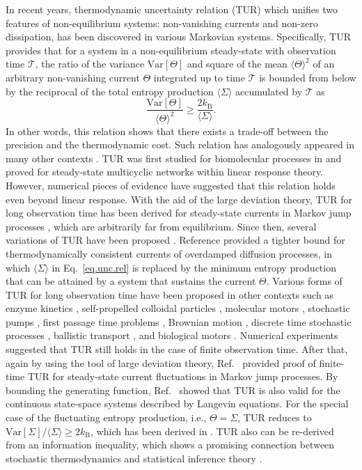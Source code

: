 \documentclass[pre,
twocolumn,
]{revtex4-1}
\theoremstyle{definition}
\theoremstyle{definition}
\newcommand{\mca}{\mathcal}
\newcommand{\mrm}{\mathrm}
\newcommand{\eq}[1]{\begin{equation}#1\end{equation}}
\newcommand{\avg}[1]{\langle #1\rangle}
\newcommand{\inl}[1]{$ #1 $}
\begin{document}
In recent years, thermodynamic uncertainty relation (TUR) which unifies two features of non-equilibrium systems: non-vanishing currents and non-zero dissipation, has been discovered in various Markovian systems.
Specifically, TUR provides that for a system in a non-equilibrium steady-state with observation time \inl{\mca{T}}, the ratio of the variance \inl{\mrm{Var}[\Theta]} and square of the mean \inl{\avg{\Theta}^2} of an arbitrary non-vanishing current \inl{\Theta} integrated up to time \inl{\mca{T}} is bounded from below by the reciprocal of the total entropy production \inl{\avg{\Sigma}} accumulated by \inl{\mca{T}} as
\eq{
\frac{\mrm{Var}[\Theta]}{\avg{\Theta}^2}\ge\frac{2k_{\mrm{B}}}{\avg{\Sigma}}.\label{eq.unc.rel}
}
In other words, this relation shows that there exists a trade-off between the precision and the thermodynamic cost.
Such relation has analogously appeared in many other contexts \cite{Mehta.2012.PNAS,Hasegawa.2018.PRE}.
TUR was first studied for biomolecular processes in \cite{Barato.2015.PRL} and proved for steady-state multicyclic networks within linear response theory.
However, numerical pieces of evidence \cite{Barato.2015.PRL} have suggested that this relation holds even beyond linear response.
With the aid of the large deviation theory, TUR for long observation time has been derived for steady-state currents in Markov jump processes \cite{Gingrich.2016.PRL}, which are arbitrarily far from equilibrium.
Since then, several variations of TUR have been proposed \cite{Pietzonka.2016.PRE}.
Reference \cite{Polettini.2016.PRE} provided a tighter bound for thermodynamically consistent currents of overdamped diffusion processes, in which \inl{\avg{\Sigma}} in Eq.~\eqref{eq.unc.rel} is replaced by the minimum entropy production that can be attained by a system that sustains the current \inl{\Theta}.
Various forms of TUR for long observation time have been proposed in other contexts such as enzyme kinetics \cite{Barato.2015.JPCB}, self-propelled colloidal particles \cite{Falasco.2016.PRE}, molecular motors \cite{Patrick.2016.JSM}, stochastic pumps \cite{Rotskoff.2017.PRE}, first passage time problems \cite{Garrahan.2017.PRE,Gingrich.2017.PRL}, Brownian motion \cite{Hyeon.2017.PRE}, discrete time stochastic processes \cite{Karel.2017.EPL,Chiuchiu.2018.PRE}, ballistic transport \cite{Brandner.2018.PRL}, and biological motors \cite{Hwang.2018.JPCL}.
Numerical experiments \cite{Pietzonka.2017.PRE} suggested that TUR still holds in the case of finite observation time.
After that, again by using the tool of large deviation theory, Ref.~\cite{Horowitz.2017.PRE} provided proof of finite-time TUR for steady-state current fluctuations in Markov jump processes.
By bounding the generating function, Ref.~\cite{Andreas.2018.JSM} showed that TUR is also valid for the continuous state-space systems described by Langevin equations.
For the special case of the fluctuating entropy production, i.e., \inl{\Theta=\Sigma}, TUR reduces to \inl{\mrm{Var}[\Sigma]/\avg{\Sigma}\ge 2k_{\mrm{B}}}, which has been derived in \cite{Pigolotti.2017.PRL}.
TUR also can be re-derived from an information inequality, which shows a promising connection between stochastic thermodynamics and statistical inference theory \cite{Hasegawa.2018.arxiv}.
\end{document}
